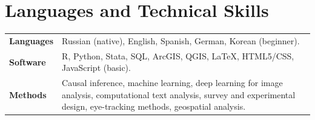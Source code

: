 \documentclass[10pt]{article}
\begin{document}

\section{Languages and Technical Skills}
\begin{tabularx}{\textwidth}{@{}>{\bfseries}l X@{}}
Languages & Russian (native), English, Spanish, German, Korean (beginner).\\
Software & R, Python, Stata, SQL, ArcGIS, QGIS, \LaTeX, HTML5/CSS, JavaScript (basic).\\
Methods & Causal inference,  machine learning, deep learning for image analysis, computational text analysis, survey and experimental design,  eye-tracking methods, geospatial analysis.\\
\end{tabularx}
\end{document}
